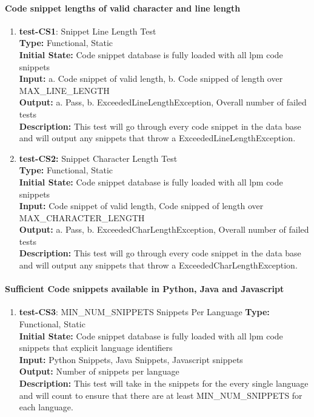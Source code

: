 \documentclass[12pt, titlepage]{article}
\begin{document}
\paragraph{Code snippet lengths of valid character and line length}
\begin{enumerate}
\item{\textbf{test-CS1}: Snippet Line Length Test\\}
\textbf{Type:} Functional, Static \\
\textbf{Initial State:} Code snippet database is fully loaded with all lpm code snippets\\
\textbf{Input:} a. Code snippet of valid length, b. Code snipped of length over MAX\_LINE\_LENGTH\\
\textbf{Output:} a. Pass, b. ExceededLineLengthException, Overall number of failed tests\\
\textbf{Description:} This test will go through every code snippet in the data base and will output any snippets that throw a ExceededLineLengthException.\\

\item{\textbf{test-CS2:} Snippet Character Length Test\\}
\textbf{Type:} Functional, Static \\
\textbf{Initial State:} Code snippet database is fully loaded with all lpm code snippets\\
\textbf{Input:} Code snippet of valid length, Code snipped of length over MAX\_CHARACTER\_LENGTH\\
\textbf{Output:} a. Pass, b. ExceededCharLengthException, Overall number of failed tests\\
\textbf{Description:} This test will go through every code snippet in the data base and will output any snippets that throw a ExceededCharLengthException.\\
\end{enumerate}

\paragraph{Sufficient Code snippets available in Python, Java and Javascript}
\begin{enumerate}

\item{\textbf{test-CS3}: MIN\_NUM\_SNIPPETS Snippets Per Language}
\textbf{Type:} Functional, Static \\
\textbf{Initial State:}  Code snippet database is fully loaded with all lpm code snippets that explicit language identifiers\\
\textbf{Input:} Python Snippets, Java Snippets, Javascript snippets \\
\textbf{Output:} Number of snippets per language\\
\textbf{Description:} This test will take in the snippets for the every single language and will count to ensure that there are at least MIN\_NUM\_SNIPPETS for each language.\\

\end{enumerate}
\end{document}
